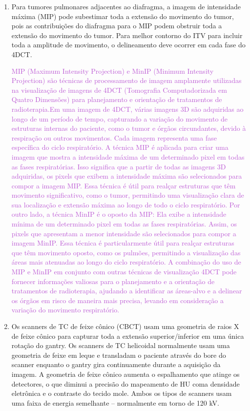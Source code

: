 \documentclass[11pt,a4paper]{article}
\begin{document}
\begin{enumerate}
        \item Para tumores pulmonares adjacentes ao diafragma, a imagem de intensidade máxima (MIP) pode subestimar toda a extensão do movimento do tumor, pois as contribuições do diafragma para o MIP podem obstruir toda a extensão do movimento do tumor. Para melhor contorno do ITV para incluir toda a amplitude de movimento, o delineamento deve ocorrer em cada fase do 4DCT. 
        
        \textcolor{MediumOrchid}{MIP (Maximum Intensity Projection) e MinIP (Minimum Intensity Projection) são técnicas de processamento de imagem amplamente utilizadas na visualização de imagens de 4DCT (Tomografia Computadorizada em Quatro Dimensões) para planejamento e orientação de tratamentos de radioterapia.Em uma imagem de 4DCT, várias imagens 3D são adquiridas ao longo de um período de tempo, capturando a variação do movimento de estruturas internas do paciente, como o tumor e órgãos circundantes, devido à respiração ou outros movimentos. Cada imagem representa uma fase específica do ciclo respiratório. A técnica MIP é aplicada para criar uma imagem que mostra a intensidade máxima de um determinado pixel em todas as fases respiratórias. Isso significa que a partir de todas as imagens 3D adquiridas, os pixels que exibem a intensidade máxima são selecionados para compor a imagem MIP. Essa técnica é útil para realçar estruturas que têm movimento significativo, como o tumor, permitindo uma visualização clara de sua localização e extensão máxima ao longo de todo o ciclo respiratório. Por outro lado, a técnica MinIP é o oposto da MIP: Ela exibe a intensidade mínima de um determinado pixel em todas as fases respiratórias. Assim, os pixels que apresentam a menor intensidade são selecionados para compor a imagem MinIP. Essa técnica é particularmente útil para realçar estruturas que têm movimento oposto, como os pulmões, permitindo a visualização das áreas mais atenuadas ao longo do ciclo respiratório. A combinação do uso de MIP e MinIP em conjunto com outras técnicas de visualização 4DCT pode fornecer informações valiosas para o planejamento e a orientação de tratamentos de radioterapia, ajudando a identificar as áreas-alvo e a delinear os órgãos em risco de maneira mais precisa, levando em consideração a variação do movimento respiratório.}
        
        \item Os scanners de TC de feixe cônico (CBCT) usam uma geometria de raios X de feixe cônico para capturar toda a extensão superior/inferior em uma única rotação do gantry. Os scanners de TC helicoidal normalmente usam uma geometria de feixe em leque e transladam o paciente através do bore do scanner enquanto o gantry gira continuamente durante a aquisição da imagem. A geometria de feixe cônico aumenta o espalhamento que atinge os detectores, o que diminui a precisão do mapeamento de HU coma  densidade eletrônica e o contraste do tecido mole. Ambos os tipos de scanners usam uma faixa de energia semelhante – normalmente em torno de 120 kV.
        

\end{enumerate}
\end{document}
